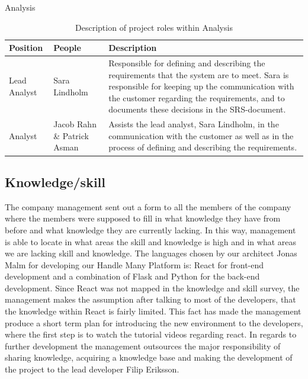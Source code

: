 \begin{table}[!hbtp]

\begin{center}
\begin{huge}
    Analysis
\end{huge}
\begin{tabular}{ | m{4cm} |m{3cm} |m{10cm}| } 
\hline
\textbf{Position} & \textbf{People} & \textbf{Description} \\ 
\hline
Lead Analyst & Sara Lindholm & Responsible for defining and describing the requirements that the system are to meet. Sara is responsible for keeping up the communication with the customer regarding the requirements, and to documents these decisions in the SRS-document.  \\
\hline
Analyst & Jacob Rahn \& Patrick Asman & Assists the lead analyst, Sara Lindholm, in the communication with the customer as well as in the process of defining and describing the requirements. \\
\hline
\end{tabular}


\end{center}
\caption{\label{tab:table-name}Description of project roles within Analysis}

\end{table}

\subsection{Knowledge/skill}
The company management sent out a form to all the members of the company where the members were supposed to fill in what knowledge they have from before and what knowledge they are currently lacking. In this way, management is able to locate in what areas the skill and knowledge is high and in what areas we are lacking skill and knowledge. The languages chosen by our architect Jonas Malm for developing our Handle Many Platform is: React for front-end development and a combination of Flask and Python for the back-end development. Since React was not mapped in the knowledge and skill survey, the management makes the assumption after talking to most of the developers, that the knowledge within React is fairly limited. This fact has made the management produce a short term plan for introducing the new environment to the developers, where the first step is to watch the tutorial videos regarding react. In regards to further development the management outsources the major responsibility of sharing knowledge, acquiring a knowledge base and making the development of the project to the lead developer Filip Eriksson. 

